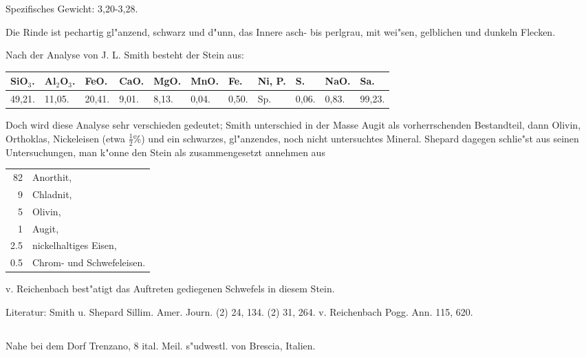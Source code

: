 \documentclass[a4paper, 11pt, oneside]{article}
\begin{document}
Spezifisches Gewicht: 3,20-3,28.

Die Rinde ist pechartig gl"anzend, schwarz und d"unn, das Innere asch- bis perlgrau, mit wei"sen, gelblichen und dunkeln Flecken.

Nach der Analyse von J. L. Smith besteht der Stein aus:
\begin{table}[!ht]
    \centering\swabfamily\Large
    \normalsize
    \begin{tabular}{l l l l l l l p{8mm} p{4mm} p{4mm} p{4mm}}
        SiO$_{3}$. & Al$_{2}$O$_{3}$. & FeO. & CaO. & MgO. & MnO. & Fe. & Ni, P. & S. & NaO. & Sa. \\ \hline
        49,21. & 11,05. & 20,41. & 9,01. & 8,13. & 0,04. & 0,50. & Sp. & 0,06. & 0,83. & 99,23. \\
    \end{tabular}
\end{table}

Doch wird diese Analyse sehr verschieden gedeutet; Smith unterschied in der Masse Augit als vorherrschenden Bestandteil, dann Olivin, Orthoklas, Nickeleisen (etwa $\mathfrak{\frac{1}{2}}$\%) und ein schwarzes, gl"anzendes, noch nicht untersuchtes Mineral. Shepard dagegen schlie"st aus seinen Untersuchungen, man k"onne den Stein als zusammengesetzt annehmen aus
\begin{table}[!ht]
    \centering\swabfamily\Large
    \begin{tabular}{r l}
        82 & Anorthit, \\
        9 & Chladnit, \\
        5 & Olivin, \\
        1 & Augit, \\
        2.5 & nickelhaltiges Eisen, \\
        0.5 & Chrom- und Schwefeleisen.  \\
    \end{tabular}
\end{table}

v. Reichenbach best"atigt das Auftreten gediegenen Schwefels in diesem Stein.

\normalsize
Literatur: Smith u. Shepard Sillim. Amer. Journ. (2) 24, 134. (2) 31, 264. v. Reichenbach Pogg. Ann. 115, 620.

\subsection{}
\LARGE
\paragraph{}
Nahe bei dem Dorf Trenzano, 8 ital. Meil. s"udwestl. von Brescia, Italien.
\end{document}

